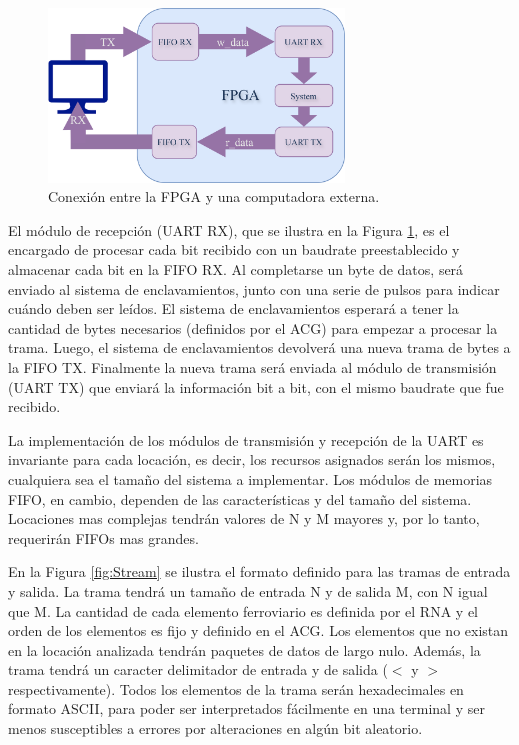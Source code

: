 	\begin{figure}[H]
		\centering
		\includegraphics[width=0.7\textwidth]{Figuras/UART_module.png}
		\centering\caption{Conexión entre la FPGA y una computadora externa.}
		\label{fig:GeneralCom}
	\end{figure}
	
	El módulo de recepción (UART RX), que se ilustra en la Figura \ref{fig:GeneralCom}, es el encargado de procesar cada bit recibido con un baudrate preestablecido y almacenar cada bit en la FIFO RX. Al completarse un byte de datos, será enviado al sistema de enclavamientos, junto con una serie de pulsos para indicar cuándo deben ser leídos. El sistema de enclavamientos esperará a tener la cantidad de bytes necesarios (definidos por el ACG) para empezar a procesar la trama. Luego, el sistema de enclavamientos devolverá una nueva trama de bytes a la FIFO TX. Finalmente la nueva trama será enviada al módulo de transmisión (UART TX) que enviará la información bit a bit, con el mismo baudrate que fue recibido.
	
	La implementación de los módulos de transmisión y recepción de la UART es invariante para cada locación, es decir, los recursos asignados serán los mismos, cualquiera sea el tamaño del sistema a implementar. Los módulos de memorias FIFO, en cambio, dependen de las características y del tamaño del sistema. Locaciones mas complejas tendrán valores de N y M mayores y, por lo tanto, requerirán FIFOs mas grandes. 
	
	En la Figura \ref{fig:Stream} se ilustra el formato definido para las tramas de entrada y salida. La trama tendrá un tamaño de entrada N y de salida M, con N igual que M. La cantidad de cada elemento ferroviario es definida por el RNA y el orden de los elementos es fijo y definido en el ACG. Los elementos que no existan en la locación analizada tendrán paquetes de datos de largo nulo. Además, la trama tendrá un caracter delimitador de entrada y de salida ($<$ y $>$ respectivamente). Todos los elementos de la trama serán hexadecimales en formato ASCII, para poder ser interpretados fácilmente en una terminal y ser menos susceptibles a errores por alteraciones en algún bit aleatorio.
	
